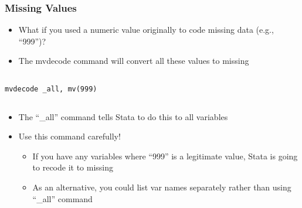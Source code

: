 \documentclass[table]{beamer}
\begin{document}
\begin{frame}[fragile]
\frametitle{Missing Values}
\label{sec-4-3}

\begin{itemize}
\item What if you used a numeric value originally to code
  missing data (e.g., ``999'')?
\item The mvdecode command will convert all these values to
  missing
\end{itemize}
\vspace{-.5em} \begin{columns}  \begin{block}{}

\begin{verbatim}
mvdecode _all, mv(999)
\end{verbatim}
\end{block} \end{columns}

\begin{itemize}
\item The ``\_all'' command tells Stata to do this to all variables
\item Use this command carefully!
\begin{itemize}
\item If you have any variables where ``999'' is a legitimate value,
     Stata is going to recode it to missing
\item As an alternative, you could list var names separately rather
     than using ``\_all'' command
\end{itemize}
\end{itemize}
\end{frame}
\end{document}
